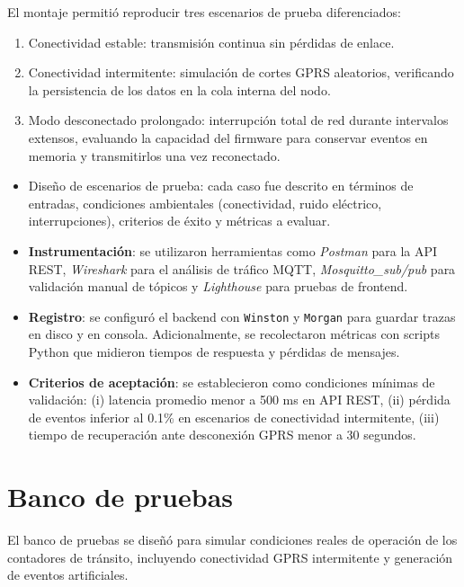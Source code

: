 El montaje permitió reproducir tres escenarios de prueba diferenciados:

\begin{enumerate}
    \item Conectividad estable: transmisión continua sin pérdidas de enlace.
    \item Conectividad intermitente: simulación de cortes GPRS aleatorios, verificando la persistencia de los datos en la cola interna del nodo.
    \item Modo desconectado prolongado: interrupción total de red durante intervalos extensos, evaluando la capacidad del firmware para conservar eventos en memoria y transmitirlos una vez reconectado.
\end{enumerate}



\begin{itemize}
    \item Diseño de escenarios de prueba: cada caso fue descrito en términos de entradas, condiciones ambientales (conectividad, ruido eléctrico, interrupciones), criterios de éxito y métricas a evaluar.
    \item \textbf{Instrumentación}: se utilizaron herramientas como \textit{Postman} para la API REST, \textit{Wireshark} para el análisis de tráfico MQTT, \textit{Mosquitto\_sub/pub} para validación manual de tópicos y \textit{Lighthouse} para pruebas de frontend.
    \item \textbf{Registro}: se configuró el backend con \texttt{Winston} y \texttt{Morgan} para guardar trazas en disco y en consola. Adicionalmente, se recolectaron métricas con scripts Python que midieron tiempos de respuesta y pérdidas de mensajes.
    \item \textbf{Criterios de aceptación}: se establecieron como condiciones mínimas de validación: 
    (i) latencia promedio menor a 500 ms en API REST, 
    (ii) pérdida de eventos inferior al 0.1\% en escenarios de conectividad intermitente,
    (iii) tiempo de recuperación ante desconexión GPRS menor a 30 segundos.
\end{itemize}

\section{Banco de pruebas}
\label{sec:banco-pruebas}

El banco de pruebas se diseñó para simular condiciones reales de operación de los contadores de tránsito, 
incluyendo conectividad GPRS intermitente y generación de eventos artificiales.  

